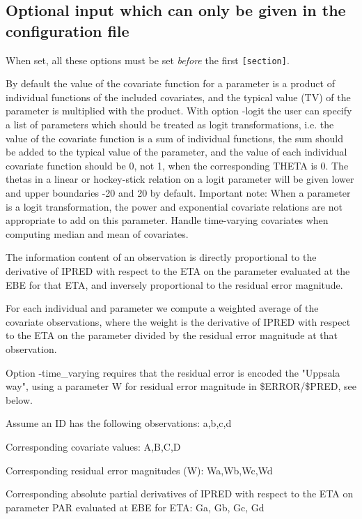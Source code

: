 \subsection{Optional input which can only be given in the configuration file}
When set, all these options must be set \emph{before} the first \verb|[section]|.
\begin{optionlist}
By default the value of the covariate function for a parameter is a product of individual functions of the included covariates, and the typical value (TV) of the parameter is multiplied with the product. With option -logit the user can specify a list of parameters which should be treated as logit transformations, i.e. the value of the covariate function is a sum of individual functions, the sum should be added to the typical value of the parameter, and the value of each individual covariate function should be 0, not 1, when the corresponding THETA is 0. The thetas in a linear or hockey-stick relation on a logit parameter will be given lower and upper boundaries -20 and 20 by default. Important note: When a parameter is a logit transformation, the power and exponential covariate relations are not appropriate to add on this parameter. 
\nextopt
{}
Handle time-varying covariates when computing median and mean of covariates.
	
The information content of an observation is directly proportional to the derivative of IPRED with respect to the ETA on the parameter evaluated at the EBE for that ETA, and inversely proportional to the residual error magnitude.

For each individual and parameter we compute a weighted average of the covariate observations, where the weight is the derivative of IPRED with respect to the ETA on the parameter divided by the residual error magnitude at that observation.
	
Option -time\_varying requires that the residual error is encoded the "Uppsala way", using a parameter W for residual error magnitude in \$ERROR/\$PRED, see below.
	
Assume an ID has the following observations: a,b,c,d
	
Corresponding covariate values: A,B,C,D
	
Corresponding residual error magnitudes (W): Wa,Wb,Wc,Wd
	
Corresponding absolute partial derivatives of IPRED with respect to the ETA on parameter PAR evaluated at EBE for ETA: Ga, Gb, Gc, Gd
	

\end{optionlist}
